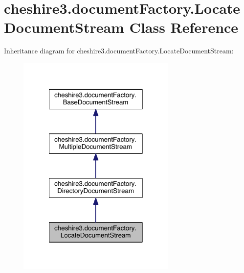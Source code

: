 \hypertarget{classcheshire3_1_1document_factory_1_1_locate_document_stream}{\section{cheshire3.\-document\-Factory.\-Locate\-Document\-Stream Class Reference}
\label{classcheshire3_1_1document_factory_1_1_locate_document_stream}
}


Inheritance diagram for cheshire3.\-document\-Factory.\-Locate\-Document\-Stream\-:
\nopagebreak
\begin{figure}[H]
\begin{center}
\leavevmode
\includegraphics[width=222pt]{classcheshire3_1_1document_factory_1_1_locate_document_stream__inherit__graph}
\end{center}
\end{figure}


